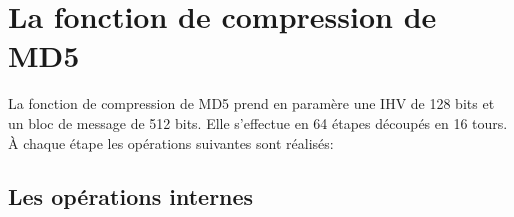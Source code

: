 \documentclass[a4paper,11pt,french]{article}
\begin{document}
\section{La fonction de compression de MD5}
La fonction de compression de MD5 prend en paramère une IHV de 128 bits et un bloc de message de 512 bits. Elle s'effectue en 64 étapes découpés en 16 tours. À chaque étape les opérations suivantes sont réalisés:\\

\subsection{Les opérations internes}
\end{document}
